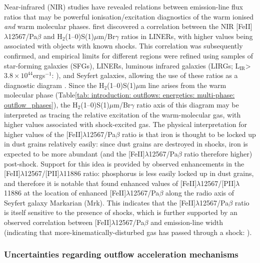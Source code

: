 Near-infrared (NIR) studies have revealed relations between emission-line flux ratios that may be powerful ionisation/excitation diagnostics of the warm ionised \textit{and} warm molecular phases. \citet{Larkin1998} first discovered a correlation between the NIR [FeII]$\lambda$12567/Pa$\beta$ and H$_2$(1--0)S(1)\;$\mu$m/Br$\gamma$ ratios in LINERs, with higher values being associated with objects with known shocks. This correlation was subsequently confirmed, and empirical limits for different regions were refined using samples of star-forming galaxies (SFGs), LINERs, luminous infrared galaxies (LIRGs; L$_\mathrm{IR}$\;\textgreater\;$3.8\times10^{44}$\;erg\;s$^{-1}$: \citealt{Sanders1996}), and Seyfert galaxies, allowing the use of these ratios as a diagnostic diagram \citep{Rodriguez-Ardila2005, Riffel2013a, Colina2015, Riffel2021}. Since the H$_2$(1--0)S(1)\;$\mu$m line arises from the warm molecular phase (Table\;\ref{tab: introduction: outflows: energetics: multi-phase: outflow_phases}), the H$_2$(1--0)S(1)\;$\mu$m/Br$\gamma$ ratio axis of this diagram may be interpreted as tracing the relative excitation of the warm-molecular gas, with higher values associated with shock-excited gas. The physical interpretation for higher values of the [FeII]$\lambda$12567/Pa$\beta$ ratio is that iron is thought to be locked up in dust grains relatively easily: since dust grains are destroyed in shocks, iron is expected to be more abundant (and the [FeII]$\lambda$12567/Pa$\beta$ ratio therefore higher) post-shock. Support for this idea is provided by observed enhancements in the [FeII]$\lambda$12567/[PII]$\lambda$11886 ratio: phosphorus is less easily locked up in dust grains, and therefore it is notable that \citet{Riffel2013b} found enhanced values of [FeII]$\lambda$12567/[PII]$\lambda$11886 at the location of enhanced [FeII]$\lambda$12567/Pa$\beta$ along the radio axis of Seyfert galaxy Markarian (Mrk). This indicates that the [FeII]$\lambda$12567/Pa$\beta$ ratio is itself sensitive to the presence of shocks, which is further supported by an observed correlation between [FeII]$\lambda$12567/Pa$\beta$ and emission-line width (indicating that more-kinematically-disturbed gas has passed through a shock: \citealt{Riffel2021}).

\subsubsection{Uncertainties regarding outflow acceleration mechanisms}
\label{section: introduction: outflows: accleration_mechanisms: conclusions}

